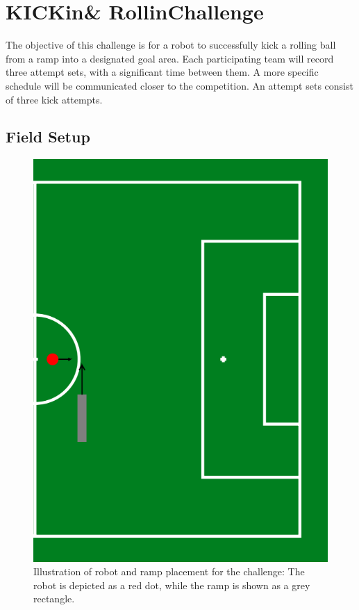 \section{KICKin\textquotesingle \& Rollin\textquotesingle Challenge}

The objective of this challenge is for a robot to successfully kick a rolling ball from a ramp into a designated goal area. 
Each participating team will record three attempt sets, with a significant time between them.
A more specific schedule will be communicated closer to the competition.
An attempt sets consist of three kick attempts. 

\subsection{Field Setup}

\begin{figure}[t]
    \centerline{\includegraphics[width=\columnwidth/2]{figs/KICKin-Rollin-Placement-figure.png}}
    \caption{Illustration of robot and ramp placement for the challenge: The robot is depicted as a red dot, while the ramp is shown as a grey rectangle.}
    \label{fig:KICKin-Rolling-Challenge}
\end{figure}

